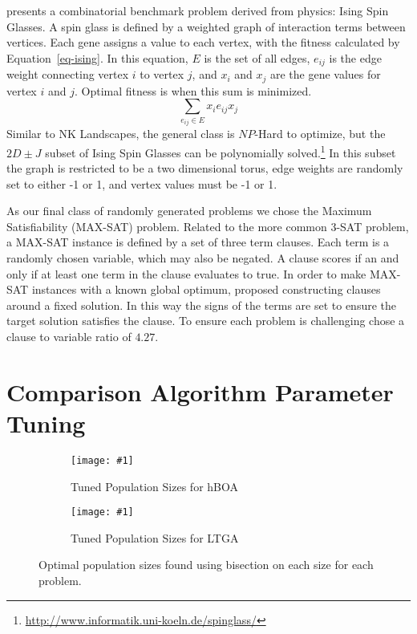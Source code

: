 \documentclass[twoside]{article}
\newcommand{\includegraphicsfit}[1]
{\texttt{[image: \#1]}}
\begin{document}
\cite{saul:1994:spinglass} presents a combinatorial benchmark problem derived from physics:
Ising Spin Glasses. A spin glass is defined by a weighted graph of interaction terms between vertices.
Each gene assigns a value to each vertex, with the fitness calculated by Equation~\ref{eq-ising}.
In this equation, $E$ is the set of all edges, $e_{ij}$ is the edge weight connecting vertex $i$ to vertex $j$, and
$x_i$ and $x_j$ are the gene values for vertex $i$ and $j$. Optimal fitness is when this sum is minimized.
\begin{equation}
\sum_{e_{ij} \in E} x_ie_{ij}x_j
  \label{eq-ising}
\end{equation}
Similar to NK Landscapes, the general class is $NP$-Hard to optimize, but the $2D\pm J$ subset of
Ising Spin Glasses can be polynomially solved.\footnote{\url{http://www.informatik.uni-koeln.de/spinglass/}}
In this subset the graph is restricted to be a two dimensional torus, edge weights are randomly set
to either -1 or 1, and vertex values must be -1 or 1.

As our final class of randomly generated problems we chose the Maximum Satisfiability (MAX-SAT) problem.
Related to the more common 3-SAT problem, a MAX-SAT instance is defined by a set of three term clauses.
Each term is a randomly chosen variable, which may also be negated. A clause scores if an and only if
at least one term in the clause evaluates to true. In order to make MAX-SAT instances with a known global
optimum, \cite{goldman:2014:p3} proposed constructing clauses around a fixed solution. In this way the
signs of the terms are set to ensure the target solution satisfies the clause. To ensure each
problem is challenging chose a clause to variable ratio of $4.27$.

\section{Comparison Algorithm Parameter Tuning}
\label{sec-tuning}

\begin{figure}[t]
  \begin{centering}
    \begin{subfigure}{.5\textwidth}
      \begin{centering}
        \includegraphicsfit{pop-hboa}
      \end{centering}
      \caption{Tuned Population Sizes for hBOA}
      \label{fig-pop-hboa}
    \end{subfigure}%
    \begin{subfigure}{.5\textwidth}
      \begin{centering}
        \includegraphicsfit{pop-ltga}
      \end{centering}
      \caption{Tuned Population Sizes for LTGA}
      \label{fig-pop-ltga}
    \end{subfigure}
  \end{centering}
  \caption{Optimal population sizes found using bisection on each size
           for each problem.}
  \label{fig-pop-sizes}
\end{figure}
\end{document}
